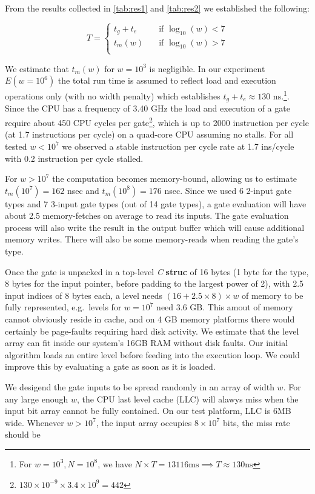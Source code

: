 \par
From the results collected in \ref{tab:res1} and \ref{tab:res2} we established the following:

\[ T =
  \begin{cases}
    t_g + t_e       & \quad \text{if } \log_{10}(w) < 7\\
    t_m(w) & \quad \text{if } \log_{10}(w) > 7\\
  \end{cases}
\]

We estimate that $t_m(w)$ for $w = 10^3$ is negligible. In our experiment $E(w = 10^6)$ the total run time is assumed to reflect load and execution operations only (with no width penalty) which establishes $t_g + t_e \approx 130\text{ ns}$.\footnote{ For $w = 10^3, N=10^8$, we have $N \times T = 13116 \text{ms} \implies T \approx 130 \text{ns}$ }. 
Since the CPU has a frequency of 3.40 GHz the load and execution of a gate require about 450 CPU cycles per gate\footnote{$130 \times 10^{-9} \times 3.4 \times 10^9 = 442$}, which is up to 2000 instruction per cycle (at 1.7 instructions per cycle) on a quad-core CPU assuming no stalls. For all tested $w < 10^7$ we observed a stable instruction per cycle rate at 1.7 ins/cycle with 0.2 instruction per cycle stalled.
\par
For $ w > 10^7$ the computation becomes memory-bound, allowing us to estimate $t_m(10^7) = 162$ nsec and $t_m(10^8) = 176$ nsec. Since we used 6 2-input gate types and 7 3-input gate types (out of 14 gate types), a gate evaluation will have about 2.5 memory-fetches on average to read its inputs. The gate evaluation process will also write the result in the output buffer which will cause additional memory writes. There will also be some memory-reads when reading the gate's type.
\par
Once the gate is unpacked in a top-level \textit{C} \textbf{struc} of 16 bytes (1 byte for the type, 8 bytes for the input pointer, before padding to the largest power of 2), with 2.5 input indices of 8 bytes each, a level needs $ (16 + 2.5 \times 8) \times w $ of memory to be fully represented, e.g.\ levels for $w = 10^7$ need 3.6 GB. This amout of memory cannot obviously reside in cache, and on 4 GB memory platforms there would certainly be page-faults requiring hard disk activity. We estimate that the level array can fit inside our system's 16GB RAM without disk faults. Our initial algorithm loads an entire level before feeding into the execution loop. We could improve this by evaluating a gate as soon as it is loaded.  
\par
We desigend the gate inputs to be spread randomly in an array of width $w$. For any large enough $w$, the CPU last level cache (LLC) will alawys miss when the input bit array cannot be fully contained. On our test platform, LLC is 6MB wide. Whenever $w > 10^7$, the input array occupies $8 \times 10^7$ bits, the miss rate should be 
